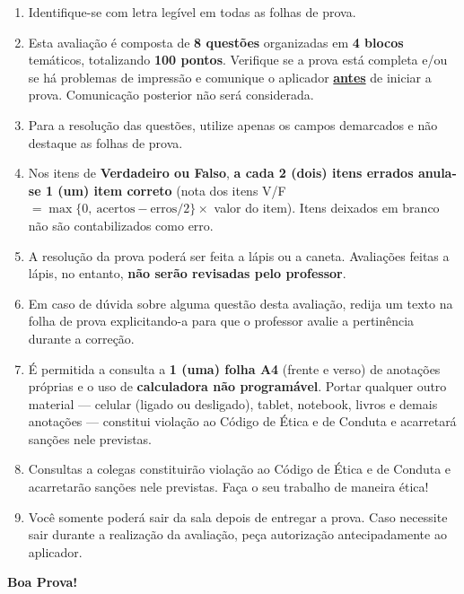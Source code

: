 \begin{small}
\begin{enumerate}[itemsep=0.12em, topsep=0.25em]
  \item Identifique-se com letra legível em todas as folhas de prova.
  \item Esta avaliação é composta de \textbf{8 questões} organizadas em \textbf{4 blocos}
        temáticos, totalizando \textbf{100 pontos}. Verifique se a prova está completa e/ou se há
        problemas de impressão e comunique o aplicador \underline{\textbf{antes}} de iniciar a
        prova. Comunicação posterior não será considerada.
  \item Para a resolução das questões, utilize apenas os campos demarcados e não destaque as
        folhas de prova.
  \item Nos itens de \textbf{Verdadeiro ou Falso}, \textbf{a cada 2 (dois) itens errados anula-se
        1 (um) item correto} (nota dos itens V/F $= \max\{0,\ \text{acertos} - \text{erros}/2\}
        \times$ valor do item). Itens deixados em branco não são contabilizados como erro.
  \item A resolução da prova poderá ser feita a lápis ou a caneta. Avaliações feitas a lápis, no
        entanto, \textbf{não serão revisadas pelo professor}.
  \item Em caso de dúvida sobre alguma questão desta avaliação, redija um texto na folha de prova
        explicitando-a para que o professor avalie a pertinência durante a correção.
  \item É permitida a consulta a \textbf{1 (uma) folha A4} (frente e verso) de anotações próprias
        e o uso de \textbf{calculadora não programável}. Portar qualquer outro material ---
        celular (ligado ou desligado), tablet, notebook, livros e demais anotações --- constitui
        violação ao Código de Ética e de Conduta e acarretará sanções nele previstas.
  \item Consultas a colegas constituirão violação ao Código de Ética e de Conduta e acarretarão
        sanções nele previstas. Faça o seu trabalho de maneira ética!
  \item Você somente poderá sair da sala depois de entregar a prova. Caso necessite sair durante a
        realização da avaliação, peça autorização antecipadamente ao aplicador.
\end{enumerate}
\end{small}

\vspace{-0.4em}
\begin{flushright}\textbf{Boa Prova!}\end{flushright}

